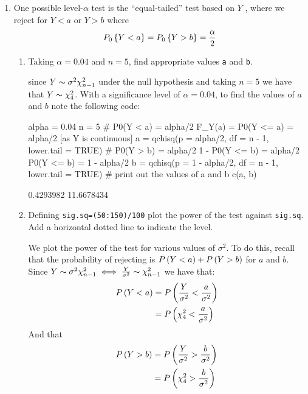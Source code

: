 \documentclass[12pt, a4paper]{article}\usepackage[]{graphicx}\usepackage[]{color}
\begin{document}
\begin{enumerate}[label = {\bfseries\arabic*.}]
\item One possible level-$\alpha$ test is the “equal-tailed” test based on $Y$ , where we reject for $Y < a$ or $Y > b$ where
$$P_0\left\{Y < a\right\} = P_0\left\{Y > b\right\} = \frac{\alpha}{2}$$
  \begin{enumerate}[label = (\alph*)]
    \item Taking $\alpha = 0.04$ and $n = 5$, find appropriate values \verb+a+ and \verb+b+.
    {\setlength{\leftskip}{3ex}
    
    
    since $Y \thicksim \sigma^2\chi_{n - 1}^2$ under the null hypothesis and taking $n = 5$ we have that $Y \thicksim \chi_4^2$. With a significance level of $\alpha = 0.04$, to find the values of $a$ and $b$ note the following code:
    
\begin{Schunk}
\begin{Sinput}
alpha = 0.04
n = 5
# P0(Y < a) = alpha/2 F_Y(a) = P0(Y <= a) = alpha/2 [as Y is continuous]
a = qchisq(p = alpha/2, df = n - 1, lower.tail = TRUE)
# P0(Y > b) = alpha/2 1 - P0(Y <= b) = alpha/2 P0(Y <= b) = 1 - alpha/2
b = qchisq(p = 1 - alpha/2, df = n - 1, lower.tail = TRUE)
# print out the values of a and b
c(a, b)
\end{Sinput}
\begin{Soutput}
[1]  0.4293982 11.6678434
\end{Soutput}
\end{Schunk}
    
    }
    \item Defining \verb+sig.sq=(50:150)/100+ plot the power of the test against \verb+sig.sq+. Add a horizontal dotted line to indicate the level.
    
    {\setlength{\leftskip}{3ex}
    
    
    We plot the power of the test for various values of $\sigma^2$. To do this, recall that the probability of rejecting  is $P\left( Y < a\right) + P\left( Y > b\right)$ for $a$ and $b$. Since $Y\thicksim \sigma^2\chi_{n - 1}^2 \iff \frac{Y}{\sigma^2} \thicksim \chi_{n - 1}^2$ we have that: 
    \begin{align*}
    P\left(Y < a\right) & = P\left(\frac{Y}{\sigma^2} < \frac{a}{\sigma^2}\right)\\
    & = P\left(\chi_{4}^2 < \frac{a}{\sigma^2}\right)
    \end{align*}
And that
    \begin{align*}
    P\left(Y > b\right) & = P\left(\frac{Y}{\sigma^2} > \frac{b}{\sigma^2}\right)\\
    & = P\left(\chi_{4}^2 > \frac{b}{\sigma^2}\right)
    \end{align*}


}
\end{enumerate}
\end{enumerate}
\end{document}
